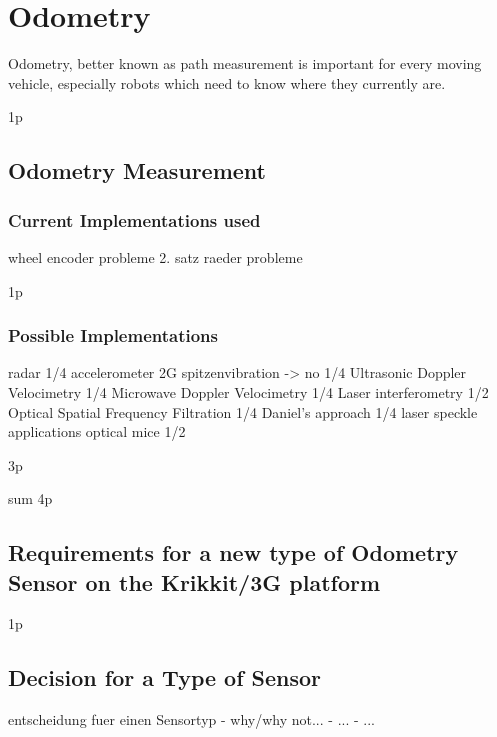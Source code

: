\documentclass[12pt,a4paper]{article}
\begin{document}



\clearpage
\section{Odometry}

Odometry, better known as path measurement is important for every moving vehicle, especially robots which need to know where they currently are. 


1p

\subsection{Odometry Measurement}

\subsubsection{Current Implementations used}

      wheel encoder
        probleme
      2. satz raeder
        probleme

1p

\subsubsection{Possible Implementations}

      radar
1/4
      accelerometer
        2G spitzenvibration -> no
1/4
      Ultrasonic Doppler Velocimetry
1/4
      Microwave Doppler Velocimetry
1/4
      Laser interferometry
1/2
      Optical Spatial Frequency Filtration
1/4
        Daniel's approach
1/4
        laser speckle applications
        optical mice
1/2

3p

sum 4p

\subsection{Requirements for a new type of Odometry Sensor on the Krikkit/3G platform}

1p


\subsection{Decision for a Type of Sensor}
  entscheidung fuer einen Sensortyp
    - why/why not...
    - ...
    - ...
\end{document}
